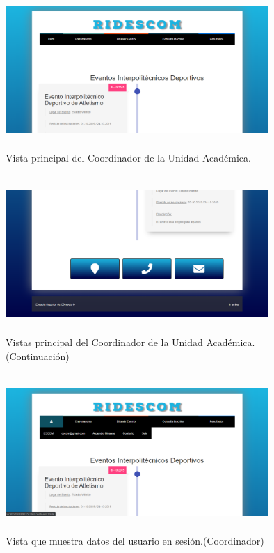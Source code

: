 		\begin{figure} [hbt!]
			\centering
			\includegraphics[width=10cm, height=6cm]{Imagenes/Vistas/Vista12_PrincipalCoord}
			\caption{Vista principal del Coordinador de la Unidad Académica.}
			\label{VistaPrincipalCoord}
		\end{figure}
		
		\begin{figure} [hbt!]
			\centering
			\includegraphics[width=10cm, height=6cm]{Imagenes/Vistas/Vista13_PrincipalCoord}
			\caption{Vistas principal del Coordinador de la Unidad Académica. (Continuación)}
			\label{VistaPrincipalCoord1}
		\end{figure}
		
		\begin{figure} [hbt!]
			\centering
			\includegraphics[width=10cm, height=6cm]{Imagenes/Vistas/Vista14_MenuUsuarioCoord}
			\caption{Vista que muestra datos del usuario en sesión.(Coordinador)}
			\label{VistaMenuCoord}
		\end{figure}
		
